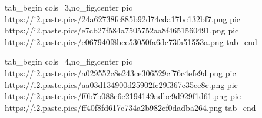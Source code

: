  
 
 
 
 
\zzSecCmtScr

\ifcmt
  tab_begin cols=3,no_fig,center
     pic https://i2.paste.pics/24a62738fc885b92d74cda17bc132bf7.png
		 pic https://i2.paste.pics/e7cb27f584a7505752aa8f4651560491.png
		 pic https://i2.paste.pics/e067940f8bce53050fa6dc73fa51553a.png
  tab_end
\fi

\ifcmt
  tab_begin cols=4,no_fig,center
		 pic https://i2.paste.pics/a029552c8e243ce306529cf76c4efe9d.png
		 pic https://i2.paste.pics/aa03d134900d25902fc29f367c35ee8c.png
		 pic https://i2.paste.pics/f0b7b088e6e2194149adbc9d929f1d61.png
		 pic https://i2.paste.pics/ff40f8fd617c734a2b982cf0dadba264.png
  tab_end
\fi
